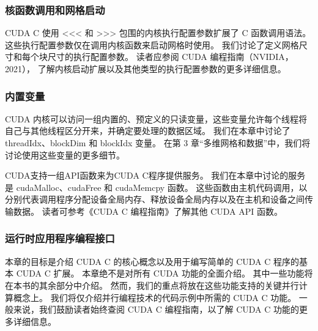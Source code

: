 \subsubsection{核函数调用和网格启动}
CUDA C 使用 <<< 和 >>> 包围的内核执行配置参数扩展了 C 函数调用语法。这些执行配置参数仅在调用内核函数来启动网格时使用。 
我们讨论了定义网格尺寸和每个块尺寸的执行配置参数。 读者应参阅 CUDA 编程指南（NVIDIA，2021），
了解内核启动扩展以及其他类型的执行配置参数的更多详细信息。


\subsubsection{内置变量}
CUDA 内核可以访问一组内置的、预定义的只读变量，这些变量允许每个线程将自己与其他线程区分开来，并确定要处理的数据区域。 
我们在本章中讨论了 threadIdx、blockDim 和 blockIdx 变量。 
在第 3 章“多维网格和数据”中，我们将讨论使用这些变量的更多细节。

CUDA支持一组API函数来为CUDA C程序提供服务。 我们在本章中讨论的服务是 cudaMalloc、cudaFree 和 cudaMemcpy 函数。 
这些函数由主机代码调用，以分别代表调用程序分配设备全局内存、释放设备全局内存以及在主机和设备之间传输数据。 
读者可参考《CUDA C 编程指南》了解其他 CUDA API 函数。


\subsubsection{运行时应用程序编程接口}
本章的目标是介绍 CUDA C 的核心概念以及用于编写简单的 CUDA C 程序的基本 CUDA C 扩展。 
本章绝不是对所有 CUDA 功能的全面介绍。 其中一些功能将在本书的其余部分中介绍。 
然而，我们的重点将放在这些功能支持的关键并行计算概念上。 我们将仅介绍并行编程技术的代码示例中所需的 CUDA C 功能。 
一般来说，我们鼓励读者始终查阅 CUDA C 编程指南，以了解 CUDA C 功能的更多详细信息。


